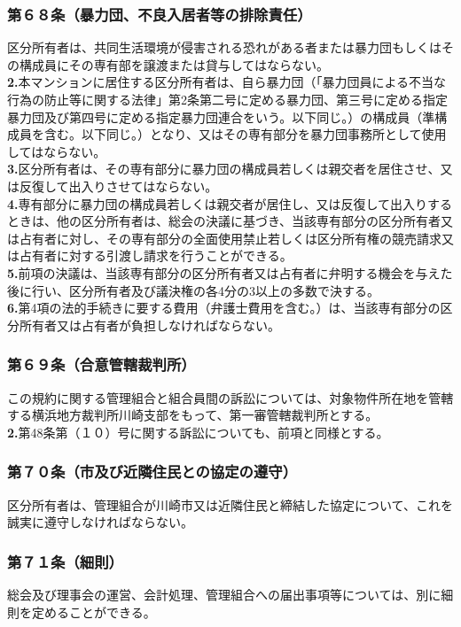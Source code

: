 \documentclass[12pt,uplatex]{jsarticle}
\begin{document}
\subsubsection*{第６８条（暴力団、不良入居者等の排除責任）}
区分所有者は、共同生活環境が侵害される恐れがある者または暴力団もしくはその構成員にその専有部を譲渡または貸与してはならない。\\
\textbf{2.}本マンションに居住する区分所有者は、自ら暴力団（「暴力団員による不当な行為の防止等に関する法律」第2条第二号に定める暴力団、第三号に定める指定暴力団及び第四号に定める指定暴力団連合をいう。以下同じ。）の構成員（準構成員を含む。以下同じ。）となり、又はその専有部分を暴力団事務所として使用してはならない。\\
\textbf{3.}区分所有者は、その専有部分に暴力団の構成員若しくは親交者を居住させ、又は反復して出入りさせてはならない。\\
\textbf{4.}専有部分に暴力団の構成員若しくは親交者が居住し、又は反復して出入りするときは、他の区分所有者は、総会の決議に基づき、当該専有部分の区分所有者又は占有者に対し、その専有部分の全面使用禁止若しくは区分所有権の競売請求又は占有者に対する引渡し請求を行うことができる。\\
\textbf{5.}前項の決議は、当該専有部分の区分所有者又は占有者に弁明する機会を与えた後に行い、区分所有者及び議決権の各4分の3以上の多数で決する。\\
\textbf{6.}第4項の法的手続きに要する費用（弁護士費用を含む。）は、当該専有部分の区分所有者又は占有者が負担しなければならない。
\subsubsection*{第６９条（合意管轄裁判所）}
この規約に関する管理組合と組合員間の訴訟については、対象物件所在地を管轄する横浜地方裁判所川崎支部をもって、第一審管轄裁判所とする。\\
\textbf{2.}第48条第（１０）号に関する訴訟についても、前項と同様とする。
\subsubsection*{第７０条（市及び近隣住民との協定の遵守）}
区分所有者は、管理組合が川崎市又は近隣住民と締結した協定について、これを誠実に遵守しなければならない。
\subsubsection*{第７１条（細則）}
総会及び理事会の運営、会計処理、管理組合への届出事項等については、別に細則を定めることができる。
\end{document}
